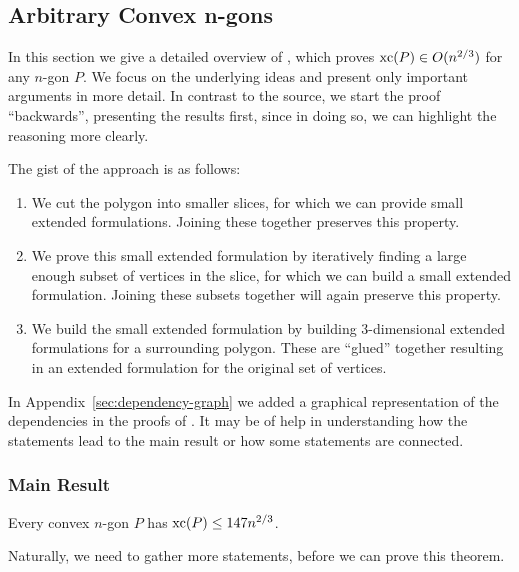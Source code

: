\subsection{Arbitrary Convex n-gons}

In this section we give a detailed overview of \cite{shitov2020sublinear}, which proves $\operatorname{xc}(P) \in O(n^{2/3})$ for any $n$-gon $P$. 
We focus on the underlying ideas and present only important arguments in more detail. In contrast to the source, we start the proof ``backwards'', presenting  the results first, since in doing so, we can highlight the reasoning more clearly.

The gist of the approach is as follows: 
\begin{enumerate}
  \item We cut the polygon into smaller slices, for which we can provide small extended formulations. Joining these together preserves this property.
  \item We prove this small extended formulation by iteratively finding a large enough subset of vertices in the slice, for which we can build a small extended formulation. Joining these subsets together will again preserve this property.
  \item We build the small extended formulation by building 3-dimensional extended formulations for a surrounding polygon. These are ``glued'' together resulting in an extended formulation for the original set of vertices.
\end{enumerate}

In Appendix~\ref{sec:dependency-graph} we added a graphical representation of the dependencies in the proofs of \cite{shitov2014sublinear}. It may be of help in understanding how the statements lead to the main result or how some statements are connected.



\subsubsection{Main Result}

\begin{theorem}\label{theorem:xc}
  Every convex $n$-gon $P$ has $\operatorname{xc}(P) \leq 147 n^{2/3}$.
\end{theorem}

Naturally, we need to gather more statements, before we can prove this theorem. 

